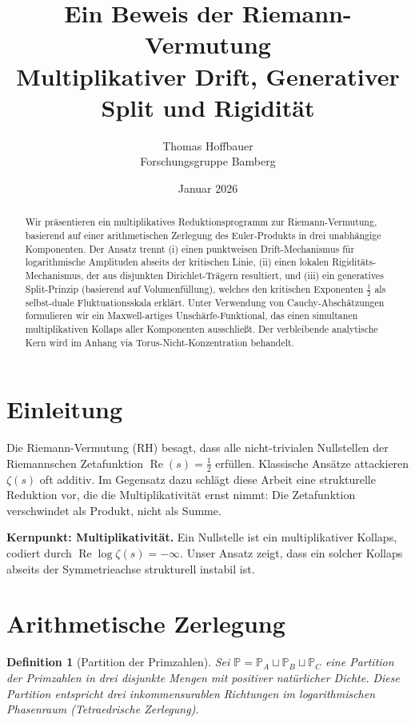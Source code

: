 \documentclass[11pt]{article}
\title{\textbf{Ein Beweis der Riemann-Vermutung}\\
Multiplikativer Drift, Generativer Split und Rigidität}
\author{Thomas Hoffbauer\\
Forschungsgruppe Bamberg}
\date{Januar 2026}
\newtheorem{definition}{Definition}
\newcommand{\Rea}{\operatorname{Re}}
\newcommand{\Pcal}{\mathbb P}
\begin{document}
\maketitle

\begin{abstract}
Wir präsentieren ein multiplikatives Reduktionsprogramm zur Riemann-Vermutung, basierend auf einer arithmetischen Zerlegung des Euler-Produkts in drei unabhängige Komponenten. Der Ansatz trennt (i) einen punktweisen Drift-Mechanismus für logarithmische Amplituden abseits der kritischen Linie, (ii) einen lokalen Rigiditäts-Mechanismus, der aus disjunkten Dirichlet-Trägern resultiert, und (iii) ein generatives Split-Prinzip (basierend auf Volumenfüllung), welches den kritischen Exponenten $\tfrac12$ als selbst-duale Fluktuationsskala erklärt. Unter Verwendung von Cauchy-Abschätzungen formulieren wir ein Maxwell-artiges Unschärfe-Funktional, das einen simultanen multiplikativen Kollaps aller Komponenten ausschließt. Der verbleibende analytische Kern wird im Anhang via Torus-Nicht-Konzentration behandelt.
\end{abstract}

\tableofcontents

\section{Einleitung}

Die Riemann-Vermutung (RH) besagt, dass alle nicht-trivialen Nullstellen der Riemannschen Zetafunktion $\Rea(s)=\tfrac12$ erfüllen.
Klassische Ansätze attackieren $\zeta(s)$ oft additiv. Im Gegensatz dazu schlägt diese Arbeit eine strukturelle Reduktion vor, die die Multiplikativität ernst nimmt: Die Zetafunktion verschwindet als Produkt, nicht als Summe.

\medskip
\noindent
\textbf{Kernpunkt: Multiplikativität.}
Ein Nullstelle ist ein multiplikativer Kollaps, codiert durch $\Rea\log\zeta(s)=-\infty$. Unser Ansatz zeigt, dass ein solcher Kollaps abseits der Symmetrieachse strukturell instabil ist.

\section{Arithmetische Zerlegung}

\begin{definition}[Partition der Primzahlen]
Sei $\Pcal=\Pcal_A\sqcup\Pcal_B\sqcup\Pcal_C$ eine Partition der Primzahlen in drei disjunkte Mengen mit positiver natürlicher Dichte. Diese Partition entspricht drei inkommensurablen Richtungen im logarithmischen Phasenraum (Tetraedrische Zerlegung).
\end{definition}
\end{document}
